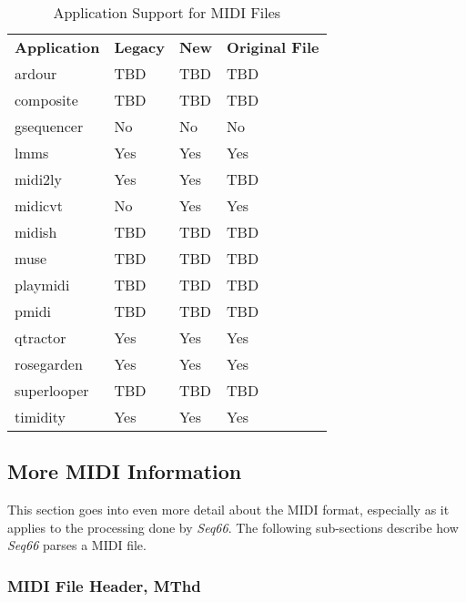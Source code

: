    \begin{table}
      \centering
      \caption{Application Support for MIDI Files}
      \label{table:midi_file_support_table}
      \begin{tabular}{l l l l}
         \textbf{Application}  &
            \textbf{Legacy} &
            \textbf{New} & 
            \textbf{Original File} \\
         ardour       & TBD       & TBD       & TBD \\
         composite    & TBD       & TBD       & TBD \\
         gsequencer   & No        & No        & No \\
         lmms         & Yes       & Yes       & Yes \\
         midi2ly      & Yes       & Yes       & TBD \\
         midicvt      & No        & Yes       & Yes \\
         midish       & TBD       & TBD       & TBD \\
         muse         & TBD       & TBD       & TBD \\
         playmidi     & TBD       & TBD       & TBD \\
         pmidi        & TBD       & TBD       & TBD \\
         qtractor     & Yes       & Yes       & Yes \\
         rosegarden   & Yes       & Yes       & Yes \\
         superlooper  & TBD       & TBD       & TBD \\
         timidity     & Yes       & Yes       & Yes \\
      \end{tabular}
   \end{table}

\subsection{More MIDI Information}
\label{subsec:midi_information_more}

   This section goes into even more detail about the MIDI format, especially as
   it applies to the processing done by \textsl{Seq66}.
   The following sub-sections describe how \textsl{Seq66}
   parses a MIDI file.

\subsubsection{MIDI File Header, MThd}
\label{subsubsec:midi_format_header}

